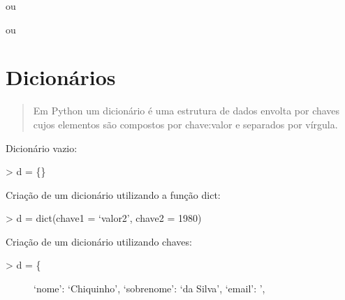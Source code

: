 \documentclass[letterpaper,10pt,brazil]{sphinxmanual}
\begin{document}
ou

\begin{sphinxVerbatim}[commandchars=\\\{\}]
  \PYG{p}{[}  \PYG{p}{]}
\end{sphinxVerbatim}

ou

\begin{sphinxVerbatim}[commandchars=\\\{\}]
    
\end{sphinxVerbatim}

\begin{sphinxVerbatim}[commandchars=\\\{\}]
\end{sphinxVerbatim}

\begin{sphinxVerbatim}[commandchars=\\\{\}]
\end{sphinxVerbatim}


\chapter{Dicionários}
\label{\detokenize{content/dict:dicionarios}}\label{\detokenize{content/dict::doc}}\begin{quote}

Em Python um dicionário é uma estrutura de dados envolta por chaves cujos elementos são compostos por chave:valor e separados por vírgula.
\end{quote}

Dicionário vazio:

\textgreater{} d = \{\}

Criação de um dicionário utilizando a função dict:

\textgreater{} d = dict(chave1 = ‘valor2’, chave2 = 1980)

Criação de um dicionário utilizando chaves:
\begin{description}
\item[{\textgreater{} d = \{}] \leavevmode
‘nome’: ‘Chiquinho’,
‘sobrenome’: ‘da Silva’,
‘email’: ’,

\end{description}
\end{document}
